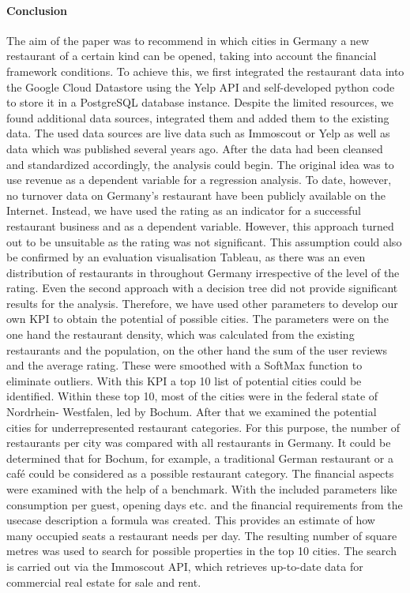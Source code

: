 \paragraph{Conclusion}
The aim of the paper was to recommend in which cities in Germany a new restaurant of a certain kind can be opened, taking into account the financial framework conditions. To achieve this, we first integrated the restaurant data into the Google Cloud Datastore using the Yelp API and self-developed python code to store it in a PostgreSQL database instance. Despite the limited resources, we found additional data sources, integrated them and added them to the existing data. The used data sources are live data such as Immoscout or Yelp as well as data which was published several years ago. After the data had been cleansed and standardized accordingly, the analysis could begin. The original idea was to use revenue as a dependent variable for a regression analysis. To date, however, no turnover data on Germany's restaurant have been publicly available on the Internet. Instead, we have used the rating as an indicator for a successful restaurant business and as a dependent variable. However, this approach turned out to be unsuitable as the rating was not significant. This assumption could also be confirmed by an evaluation visualisation Tableau, as there was an even distribution of restaurants in throughout Germany irrespective of the level of the rating. %
Even the second approach with a decision tree did not provide significant results for the analysis. Therefore, we have used other parameters to develop our own KPI to obtain the potential of possible cities. The parameters were on the one hand the restaurant density, which was calculated from the existing restaurants and the population, on the other hand the sum of the user reviews and the average rating. These were smoothed with a SoftMax function to eliminate outliers. With this KPI a top 10 list of potential cities could be identified. Within these top 10, most of the cities were in the federal state of Nordrhein- Westfalen, led by Bochum. After that we examined the potential cities for underrepresented restaurant categories. For this purpose, the number of restaurants per city was compared with all restaurants in Germany. It could be determined that for Bochum, for example, a traditional German restaurant or a café could be considered as a possible restaurant category.
The financial aspects were examined with the help of a benchmark. With the included parameters like consumption per guest, opening days etc. and the financial requirements from the usecase description a formula was created. This provides an estimate of how many occupied seats a restaurant needs per day. The resulting number of square metres was used to search for possible properties in the top 10 cities. The search is carried out via the Immoscout API, which retrieves up-to-date data for commercial real estate for sale and rent. %
